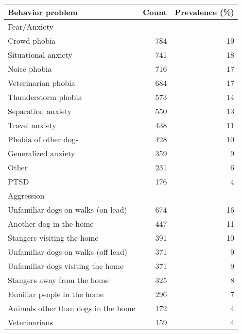 \documentclass[varwidth=\maxdimen]{standalone}
\newcommand{\subrow}[1]{\hspace{1.25em}#1}
\begin{document}
\begin{tabular}[t]{lrr}
\toprule
Behavior problem &  Count &  Prevalence (\%) \\
\midrule
Fear/Anxiety \\
  \subrow{Crowd phobia}                        &      784 &           19 \\
  \subrow{Situational anxiety}                 &      741 &           18 \\
  \subrow{Noise phobia}                        &      716 &           17 \\
  \subrow{Veterinarian phobia}                 &      684 &           17 \\
  \subrow{Thunderstorm phobia}                 &      573 &           14 \\
  \subrow{Separation anxiety}                  &      550 &           13 \\
  \subrow{Travel anxiety}                      &      438 &           11 \\
  \subrow{Phobia of other dogs}                &      428 &           10 \\
  \subrow{Generalized anxiety}                 &      359 &            9 \\
  \subrow{Other}                               &      231 &            6 \\
  \subrow{PTSD}                                &      176 &            4 \\
Aggression \\
  \subrow{Unfamiliar dogs on walks (on lead)}  &      674 &           16 \\
  \subrow{Another dog in the home}             &      447 &           11 \\
  \subrow{Stangers visiting the home}          &      391 &            10 \\
  \subrow{Unfamiliar dogs on walks (off lead)} &      371 &            9 \\
  \subrow{Unfamiliar dogs visiting the home}   &      371 &            9 \\
  \subrow{Stangers away from the home}         &      325 &            8 \\
  \subrow{Familiar people in the home}         &      296 &            7 \\
  \subrow{Animals other than dogs in the home} &      172 &            4 \\
  \subrow{Veterinarians}                       &      159 &            4 \\

\end{tabular}
\end{document}
